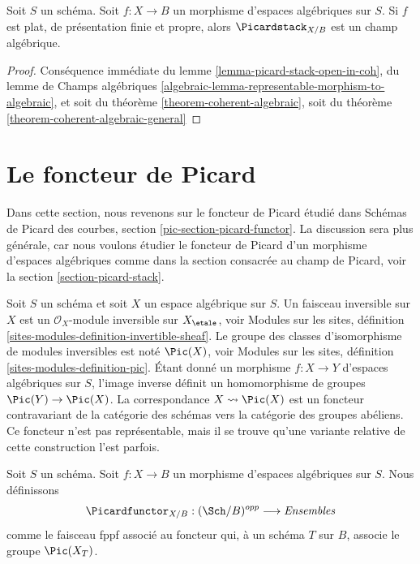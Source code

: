 \begin{proposition}
\label{proposition-pic}
Soit $S$ un schéma. Soit $f : X \to B$ un morphisme d'espaces algébriques sur
$S$. Si $f$ est plat, de présentation finie et propre, alors
$\Picardstack_{X/B}$ est un champ algébrique.
\end{proposition}

\begin{proof}
Conséquence immédiate du lemme \ref{lemma-picard-stack-open-in-coh}, du lemme
de Champs algébriques
\ref{algebraic-lemma-representable-morphism-to-algebraic}, et soit du théorème
\ref{theorem-coherent-algebraic}, soit du théorème
\ref{theorem-coherent-algebraic-general}
\end{proof}

\section{Le foncteur de Picard}
\label{section-picard-functor}

\noindent
Dans cette section, nous revenons sur le foncteur de Picard étudié dans
Schémas de Picard des courbes, section \ref{pic-section-picard-functor}.
La discussion sera plus générale, car nous voulons étudier le foncteur de
Picard d'un morphisme d'espaces algébriques comme dans la section consacrée au
champ de Picard, voir la section \ref{section-picard-stack}.

\medskip\noindent
Soit $S$ un schéma et soit $X$ un espace algébrique sur $S$.
Un faisceau inversible sur $X$ est un $\mathcal{O}_X$-module inversible
sur $X_\etale$, voir
Modules sur les sites, définition \ref{sites-modules-definition-invertible-sheaf}.
Le groupe des classes d'isomorphisme de modules inversibles est noté
$\Pic(X)$, voir
Modules sur les sites, définition \ref{sites-modules-definition-pic}.
Étant donné un morphisme $f : X \to Y$ d'espaces algébriques sur $S$,
l'image inverse définit un homomorphisme de groupes $\Pic(Y) \to \Pic(X)$.
La correspondance
$X \leadsto \Pic(X)$ est un foncteur contravariant de la catégorie
des schémas vers la catégorie des groupes abéliens. Ce foncteur n'est pas
représentable, mais il se trouve qu'une variante relative de cette construction
l'est parfois.

\begin{situation}
\label{situation-pic}
Soit $S$ un schéma.
Soit $f : X \to B$ un morphisme d'espaces algébriques sur $S$.
Nous définissons
$$
\Picardfunctor_{X/B} : (\Sch/B)^{opp} \longrightarrow \textit{Ensembles}
$$
comme le faisceau fppf associé au foncteur qui, à un schéma $T$
sur $B$, associe le groupe $\Pic(X_T)$.
\end{situation}

